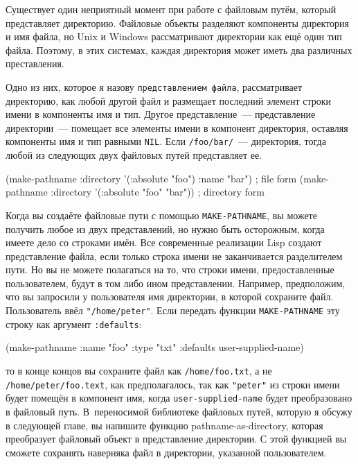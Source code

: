 Существует один неприятный момент при работе с файловым путём, который представляет
директорию. Файловые объекты разделяют компоненты директория и имя файла, но Unix и
Windows рассматривают директории как ещё один тип файла. Поэтому, в этих системах, каждая
директория может иметь два различных преставления.

Одно из них, которое я назову \lstinline{представлением файла}, рассматривает директорию, как
любой другой файл и размещает последний элемент строки имени в компоненты имя и
тип. Другое представление~--- представление директории~--- помещает все элементы имени в
компонент директория, оставляя компоненты имя и тип равными \lstinline{NIL}. Если
\lstinline{/foo/bar/}~--- директория, тогда любой из следующих двух файловых путей представляет
ее.

\begin{myverb}
(make-pathname :directory '(:absolute "foo") :name "bar") ; file form 
(make-pathname :directory '(:absolute "foo" "bar"))       ; directory form 
\end{myverb}

Когда вы создаёте файловые пути с помощью \lstinline{MAKE-PATHNAME}, вы можете получить любое
из двух представлений, но нужно быть осторожным, когда имеете дело со строками имён. Все
современные реализации Lisp создают представление файла, если только строка имени не
заканчивается разделителем пути. Но вы не можете полагаться на то, что строки имени,
предоставленные пользователем, будут в том либо ином представлении. Например, предположим,
что вы запросили у пользователя имя директории, в которой сохраните файл. Пользователь
ввёл \lstinline!"/home/peter"!. Если передать функции \lstinline{MAKE-PATHNAME} эту строку как
аргумент \lstinline{:defaults}:

\begin{myverb}
(make-pathname :name "foo" :type "txt" :defaults user-supplied-name) 
\end{myverb}

то в конце концов вы сохраните файл как \lstinline{/home/foo.txt}, а не
\lstinline{/home/peter/foo.text}, как предполагалось, так как \lstinline{"peter"} из строки имени
будет помещён в компонент имя, когда \lstinline{user-supplied-name} будет преобразовано в
файловый путь. В~переносимой библиотеке файловых путей, которую я обсужу в следующей
главе, вы напишите функцию pathname-as-directory, которая преобразует файловый объект в
представление директории. С этой функцией вы сможете сохранять наверняка файл в
директории, указанной пользователем.

